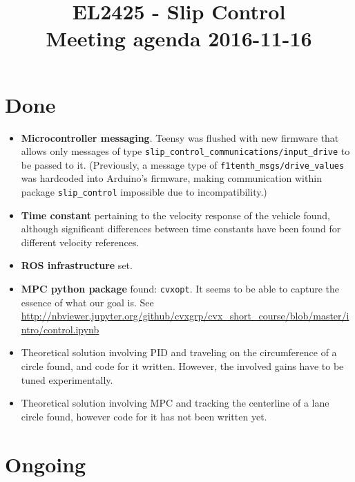 \documentclass[oneside,12pt]{article}
\title{EL2425 - Slip Control \\ Meeting agenda 2016-11-16}
\begin{document}
\maketitle

\section{Done}

\begin{itemize}
  \item \textbf{Microcontroller messaging}. Teensy was flushed with new firmware that
    allows only messages of type \texttt{slip\_control\_communications/input\_drive}
    to be passed to it. (Previously, a message type of \texttt{f1tenth\_msgs/drive\_values}
    was hardcoded into Arduino's firmware, making communication within package
    \texttt{slip\_control} impossible due to incompatibility.)
  \item \textbf{Time constant} pertaining to the velocity response of the vehicle
    found, although significant differences between time constants have been
    found for different velocity references.
  \item \textbf{ROS infrastructure} set.
  \item \textbf{MPC python package} found: \texttt{cvxopt}. It seems to be able to
    capture the essence of what our goal is.
    See \url{http://nbviewer.jupyter.org/github/cvxgrp/cvx_short_course/blob/master/intro/control.ipynb}
  \item Theoretical solution involving PID and traveling on the circumference
    of a circle found, and code for it written. However, the involved gains
    have to be tuned experimentally.
  \item Theoretical solution involving MPC and tracking the centerline of a lane
    circle found, however code for it has not been written yet.

\end{itemize}



\section{Ongoing}
\end{document}
